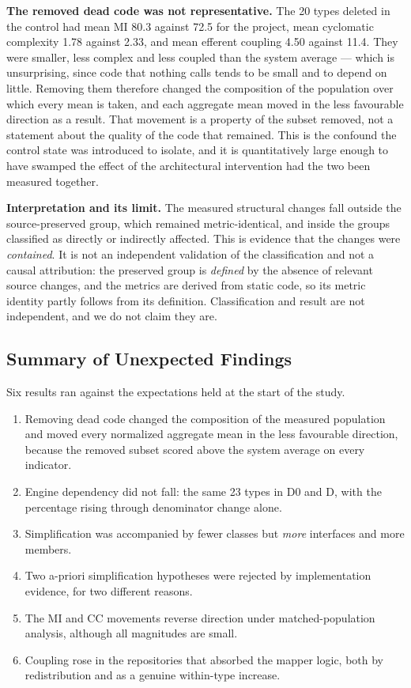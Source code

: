 \documentclass{sbc2019}%
\begin{document}
\medskip\noindent\textbf{The removed dead code was not representative.} The 20
types deleted in the control had mean MI 80.3 against 72.5 for the project, mean
cyclomatic complexity 1.78 against 2.33, and mean efferent coupling 4.50 against
11.4. They were smaller, less complex and less coupled than the system
average --- which is unsurprising, since code that nothing calls tends to be
small and to depend on little. Removing them therefore changed the composition of
the population over which every mean is taken, and each aggregate mean moved in
the less favourable direction as a result. That movement is a property of the
subset removed, not a statement about the quality of the code that remained. This
is the confound the control state was introduced to isolate, and it is quantitatively large enough to have swamped the effect of the
architectural intervention had the two been measured together.

\medskip\noindent\textbf{Interpretation and its limit.} The measured structural
changes fall outside the source-preserved group, which remained
metric-identical, and inside the groups classified as directly or indirectly
affected. This is evidence that the changes were \emph{contained}. It is not an independent validation of
the classification and not a causal attribution: the preserved group is
\emph{defined} by the absence of relevant source changes, and the metrics are
derived from static code, so its metric identity partly follows from its
definition. Classification and result are not independent, and we do not claim
they are.

\subsection{Summary of Unexpected Findings}

Six results ran against the expectations held at the start of the study.

\begin{enumerate}\itemsep2pt
\item Removing dead code changed the composition of the measured population and
moved every normalized aggregate mean in the less favourable direction, because
the removed subset scored above the system average on every indicator.
\item Engine dependency did not fall: the same 23 types in D0 and D, with the
percentage rising through denominator change alone.
\item Simplification was accompanied by fewer classes but \emph{more} interfaces
and more members.
\item Two a-priori simplification hypotheses were rejected by implementation
evidence, for two different reasons.
\item The MI and CC movements reverse direction under matched-population
analysis, although all magnitudes are small.
\item Coupling rose in the repositories that absorbed the mapper logic, both by
redistribution and as a genuine within-type increase.
\end{enumerate}
\end{document}
